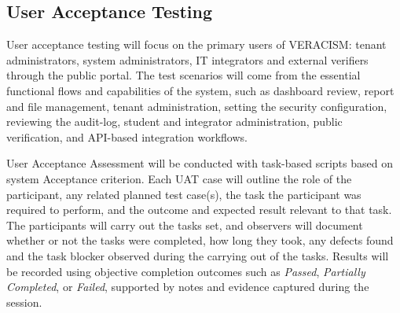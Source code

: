 \subsection{User Acceptance Testing}

User acceptance testing will focus on the primary users of VERACISM: tenant administrators, system administrators, IT integrators and external verifiers through the public portal. The test scenarios will come from the essential functional flows and capabilities of the system, such as dashboard review, report and file management, tenant administration, setting the security configuration, reviewing the audit-log, student and integrator administration, public verification, and API-based integration workflows.

User Acceptance Assessment will be conducted with task-based scripts based on system Acceptance criterion. Each UAT case will outline the role of the participant, any related planned test case(s), the task the participant was required to perform, and the outcome and expected result relevant to that task. The participants will carry out the tasks set, and observers will document whether or not the tasks were completed, how long they took, any defects found and the task blocker observed during the carrying out of the tasks. Results will be
recorded using objective completion outcomes such as \textit{Passed},
\textit{Partially Completed}, or \textit{Failed}, supported by notes and
evidence captured during the session.

